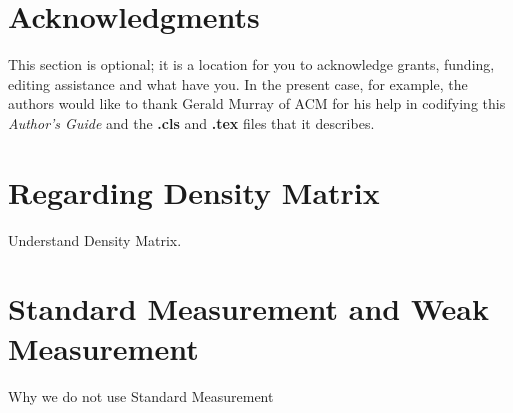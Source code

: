 \documentclass{sig-alternate-05-2015}
\begin{document}
\section{Acknowledgments}
This section is optional; it is a location for you
to acknowledge grants, funding, editing assistance and
what have you.  In the present case, for example, the
authors would like to thank Gerald Murray of ACM for
his help in codifying this \textit{Author's Guide}
and the \textbf{.cls} and \textbf{.tex} files that it describes.

%

%
%
\appendix
\section{Regarding Density Matrix}
Understand Density Matrix.
\section{Standard Measurement and Weak Measurement}
Why we do not use Standard Measurement 
\end{document}
